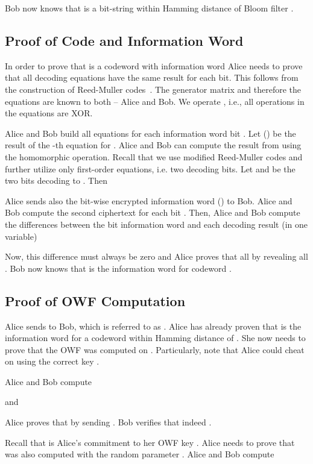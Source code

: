 \documentclass{llncs}
\begin{document}
Bob now knows that  is a bit-string within Hamming distance  of Bloom filter .

\subsection{Proof of Code and Information Word}
\label{sec:zkpcode}



In order to prove that  is a codeword with information word  Alice needs to prove that all decoding equations have the same result for each bit.
This follows from the construction of Reed-Muller codes~\cite{Mul54,Ree54}.
The generator matrix and therefore the equations are known to both -- Alice and Bob.
We operate , i.e., all operations in the equations are XOR.

Alice and Bob build all equations for each information word bit .
Let  () be the result of the -th equation for .
Alice and Bob can compute the result  from  using the homomorphic operation.
Recall that we use modified Reed-Muller codes and further utilize only first-order equations, i.e. two decoding bits.
Let  and  be the two bits decoding to .
Then


Alice sends also the bit-wise encrypted information word  () to Bob.
Alice and Bob compute the second ciphertext for each bit .
Then, Alice and Bob compute the differences between the bit information word and each decoding result (in one variable)

Now, this difference must always be zero and Alice proves that all  by revealing all .
Bob now knows that  is the information word for codeword .

\subsection{Proof of OWF Computation}
\label{sec:zkpmac}

Alice sends  to Bob, which is referred to as .
Alice has already proven that  is the information word for a codeword  within Hamming distance  of .
She now needs to prove that the OWF was computed on .
Particularly, note that Alice could cheat on using the correct key .

Alice and Bob compute

and

Alice proves that  by sending .
Bob verifies that indeed .

Recall that  is Alice's commitment to her OWF key .
Alice needs to prove that  was also computed with the random parameter .
Alice and Bob compute
\end{document}
